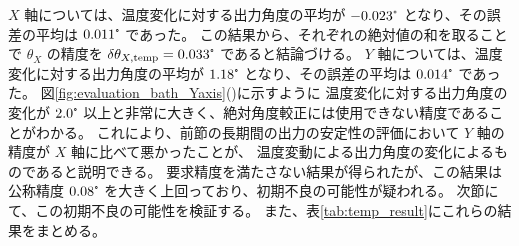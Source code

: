 \documentclass[../../main.tex]{subfiles}
\begin{document}
$X$ 軸については、温度変化に対する出力角度の平均が $-0.023\tcdegree$ となり、その誤差の平均は $0.011\tcdegree$ であった。
この結果から、それぞれの絶対値の和を取ることで $\theta_{X}$ の精度を 
$\delta\theta_{X,\mathrm{temp}} = 0.033\tcdegree$ であると結論づける。
$Y$ 軸については、温度変化に対する出力角度の平均が $1.18\tcdegree$ となり、その誤差の平均は $0.014\tcdegree$ であった。
図\ref{fig:evaluation_bath_Yaxis}()に示すように
温度変化に対する出力角度の変化が $2.0\tcdegree$ 以上と非常に大きく、絶対角度較正には使用できない精度であることがわかる。
これにより、前節の長期間の出力の安定性の評価において $Y$ 軸の精度が $X$ 軸に比べて悪かったことが、
温度変動による出力角度の変化によるものであると説明できる。
要求精度を満たさない結果が得られたが、この結果は公称精度 $0.08\tcdegree$ を大きく上回っており、初期不良の可能性が疑われる。
次節にて、この初期不良の可能性を検証する。
また、表\ref{tab:temp_result}にこれらの結果をまとめる。
\end{document}
